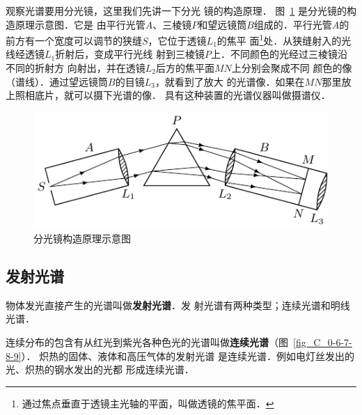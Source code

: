 观察光谱要用分光镜，这里我们先讲一下分光
镜的构造原理．
图~\ref{fig_C_6-18} 是分光镜的构造原理示意图．它是
由平行光管$A$、三棱镜$P$和望远镜筒$B$组成的．平行光管$A$的
前方有一个宽度可以调节的狭缝$S$，它位于透镜$L_1$的焦平
面\footnote{通过焦点垂直于透镜主光轴的平面，叫做透镜的焦平面．}处．从狭缝射入的光线经透镜$L_1$折射后，变成平行光线
射到三棱镜$P$上．不同颜色的光经过三棱镜沿不同的折射方
向射出，并在透镜$L_2$后方的焦平面$MN$上分别会聚成不同
颜色的像（谱线）．通过望远镜筒$B$的目镜$L_3$，就看到了放大
的光谱像．如果在$MN$那里放上照相底片，就可以摄下光谱的像．
具有这种装置的光谱仪器叫做摄谱仪．
\begin{figure}[htbp]
	\centering
	\includegraphics{fig/C/6-18.pdf}
	\caption{分光镜构造原理示意图}\label{fig_C_6-18}
\end{figure}



\subsection{发射光谱}

物体发光直接产生的光谱叫做\textbf{发射光谱}．发
射光谱有两种类型；连续光谱和明线光谱．

连续分布的包含有从红光到紫光各种色光的光谱叫做\textbf{连续光谱}（图~\ref{fig_C_0-6-7-8-9}）．
炽热的固体、液体和高压气体的发射光谱
是连续光谱．例如电灯丝发出的光、炽热的钢水发出的光都
形成连续光谱．

